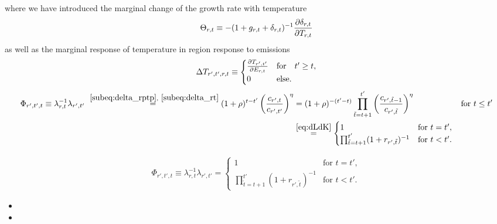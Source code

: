 \documentclass[preprint,3p,authoryear]{elsarticle}
\begin{document}
where we have introduced the marginal change of the growth rate with temperature
\begin{equation}
  \label{eq:Theta}
  \Theta_{r,t}\equiv - (1+g_{r,t}+\delta_{r,t})^{-1}\frac{\partial\delta_{r,t}}{\partial T_{r,t}}
\end{equation}
as well as the marginal response of temperature in region response to emissions
\begin{equation}
  \label{eq:DeltaT}
  \Delta T_{r',t',r,t}\equiv\begin{cases}
    \frac{\partial T_{r',t'}}{\partial E_{r,t}} & \text{for}\quad t'\geq t,\\
    0 & \text{else}    .
  \end{cases}
\end{equation}
\begin{align}
  \label{eq:Phi} \Phi_{r',t',t}\equiv\lambda_{r,t}^{-1}\lambda_{r',t'}\overset{~\eqref{subeq:delta_rptp},~\eqref{subeq:delta_rt}}{=}(1+\rho)^{t-t'}\left(\frac{c_{r',t}}{c_{r',t'}}\right)^{\eta}&\overset{}{=} (1+\rho)^{-(t'-t)}\prod_{\tilde{t}=t+1}^{t'}\left(\frac{c_{r',\tilde{t}-1}}{c_{r',\tilde{t}}}\right)^{\eta} &\text{for }t\leq t'\\
       &\overset{\eqref{eq:dLdK}}{=}
         \begin{cases}
           1 &\text{for }t=t',\\
           \prod_{\tilde{t}=t+1}^{t'}(1+r_{r',\tilde{t}})^{-1} & \text{for }t<t'.
           \end{cases}
\end{align}

\begin{align*}
\Phi_{r',t',t}\equiv\lambda_{r,t}^{-1}\lambda_{r',t'}=
         \begin{cases}
           1 &\text{for }t=t',\\
           \prod_{\tilde{t}=t+1}^{t'}(1+r_{r',\tilde{t}})^{-1} & \text{for }t<t'.
           \end{cases}
\end{align*}


\begin{itemize}
\item {}
\item {}
\end{itemize}
\end{document}
